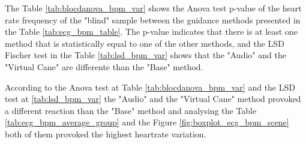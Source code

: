 \begin{table}[!htb]
    \begin{minipage}{.45\linewidth}
        
    \end{minipage}
    \hfill
    \begin{minipage}{.45\linewidth}
        \vspace{-2.75cm}
        
    \end{minipage}
\end{table}

The Table \ref{tab:blocdanova_bpm_var} shows the Anova test p-value of the heart rate frequency of the "blind" sample between the guidance methods presented in the Table \ref{tab:ecg_bpm_table}. The p-value indicates that there is at least one method that is statistically equal to one of the other methods, and the LSD Fischer test in the Table \ref{tab:lsd_bpm_var} shows that the "Audio" and the "Virtual Cane" are differente than the "Base" method.





According to the Anova test at Table \ref{tab:blocdanova_bpm_var} and the LSD test at \ref{tab:lsd_bpm_var} the "Audio" and the "Virtual Cane" method provoked a different reaction than the "Base" method and analysing the Table \ref{tab:ecg_bpm_average_group} and the Figure \ref{fig:boxplot_ecg_bpm_scene} both of them provoked the highest heartrate variation.

\FloatBarrier